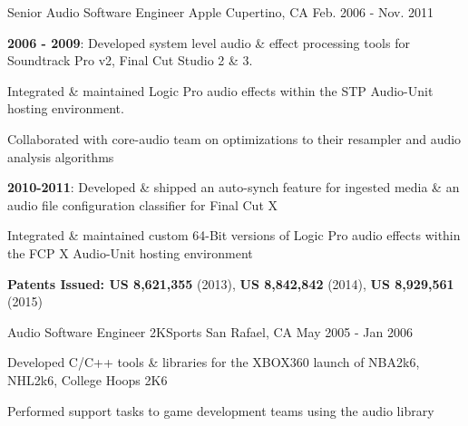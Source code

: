 \begin{cventries}
  \cventry
    {Senior Audio Software Engineer} %
    {Apple} %
    {Cupertino, CA} %
    {Feb. 2006 - Nov. 2011} %
    {
      \begin{cvitems} %
        \item {\textbf{2006 - 2009}: Developed system level audio \& effect processing tools for Soundtrack Pro v2, Final Cut Studio 2 \& 3}. 
        \item {Integrated \& maintained Logic Pro audio effects within the STP Audio-Unit hosting environment.}
        \item {Collaborated with core-audio team on optimizations to their resampler and audio analysis algorithms}
        \item {\textbf{2010-2011}: Developed \& shipped an auto-synch feature for ingested media \& an audio file configuration classifier for Final Cut X}
		\item {Integrated \& maintained custom 64-Bit versions of Logic Pro audio effects within the FCP X Audio-Unit hosting environment}
		\item {\textbf{Patents Issued: US 8,621,355} (2013), \textbf{US 8,842,842} (2014), \textbf{US 8,929,561} (2015)}
      \end{cvitems}
    }

  \cventry
    {Audio Software Engineer} %
    {2KSports} %
    {San Rafael, CA} %
    {May 2005 - Jan 2006} %
    {
      \begin{cvitems} %
        \item {Developed C/C++ tools \& libraries for the XBOX360 launch of NBA2k6, NHL2k6, College Hoops 2K6}
        \item {Performed support tasks to game development teams using the audio library}
      \end{cvitems}
    }

\end{cventries}
